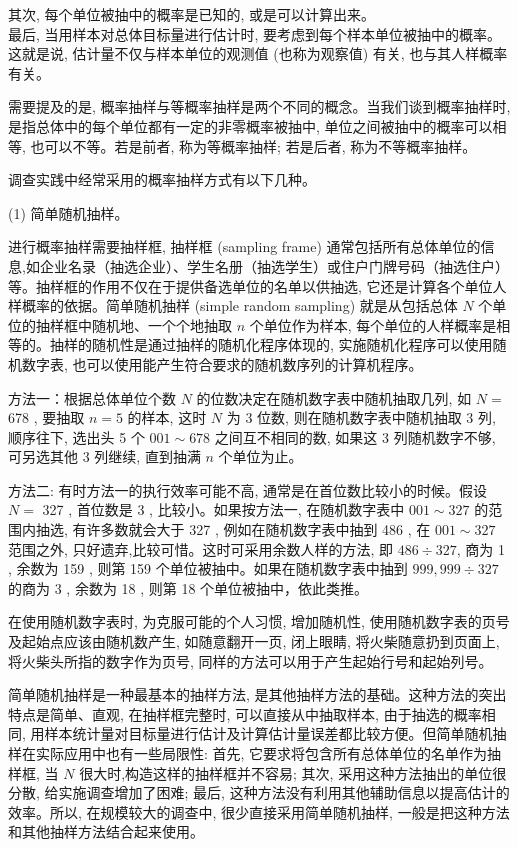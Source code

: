 \documentclass[10pt]{article}
\begin{document}
\begin{CJK*}{UTF8}{bsmi}
其次, 每个单位被抽中的概率是已知的, 或是可以计算出来。\\
最后, 当用样本对总体目标量进行估计时, 要考虑到每个样本单位被抽中的概率。这就是说, 估计量不仅与样本单位的观测值 (也称为观察值) 有关, 也与其人样概率有关。

需要提及的是, 概率抽样与等概率抽样是两个不同的概念。当我们谈到概率抽样时,是指总体中的每个单位都有一定的非零概率被抽中, 单位之间被抽中的概率可以相等, 也可以不等。若是前者, 称为等概率抽样; 若是后者, 称为不等概率抽样。

调查实践中经常采用的概率抽样方式有以下几种。

(1) 简单随机抽样。

进行概率抽样需要抽样框, 抽样框 (sampling frame) 通常包括所有总体单位的信息,如企业名录（抽选企业）、学生名册（抽选学生）或住户门牌号码（抽选住户）等。抽样框的作用不仅在于提供备选单位的名单以供抽选, 它还是计算各个单位人样概率的依据。简单随机抽样 (simple random sampling) 就是从包括总体 $N$ 个单位的抽样框中随机地、一个个地抽取 $n$ 个单位作为样本, 每个单位的人样概率是相等的。抽样的随机性是通过抽样的随机化程序体现的, 实施随机化程序可以使用随机数字表, 也可以使用能产生符合要求的随机数序列的计算机程序。

方法一：根据总体单位个数 $N$ 的位数决定在随机数字表中随机抽取几列, 如 $N=$ 678 , 要抽取 $n=5$ 的样本, 这时 $N$ 为 3 位数, 则在随机数字表中随机抽取 3 列, 顺序往下, 选出头 5 个 $001 \sim 678$ 之间互不相同的数, 如果这 3 列随机数字不够, 可另选其他 3 列继续, 直到抽满 $n$ 个单位为止。

方法二: 有时方法一的执行效率可能不高, 通常是在首位数比较小的时候。假设 $N=$ 327 , 首位数是 3 , 比较小。如果按方法一, 在随机数字表中 $001 \sim 327$ 的范围内抽选, 有许多数就会大于 327 , 例如在随机数字表中抽到 486 , 在 $001 \sim 327$ 范围之外, 只好遗弃,比较可惜。这时可采用余数人样的方法, 即 $486 \div 327$, 商为 1 , 余数为 159 , 则第 159 个单位被抽中。如果在随机数字表中抽到 $999,999 \div 327$ 的商为 3 , 余数为 18 , 则第 18 个单位被抽中，依此类推。

在使用随机数字表时, 为克服可能的个人习惯, 增加随机性, 使用随机数字表的页号及起始点应该由随机数产生, 如随意翻开一页, 闭上眼睛, 将火柴随意扔到页面上, 将火柴头所指的数字作为页号, 同样的方法可以用于产生起始行号和起始列号。

简单随机抽样是一种最基本的抽样方法, 是其他抽样方法的基础。这种方法的突出特点是简单、直观, 在抽样框完整时, 可以直接从中抽取样本, 由于抽选的概率相同, 用样本统计量对目标量进行估计及计算估计量误差都比较方便。但简单随机抽样在实际应用中也有一些局限性: 首先, 它要求将包含所有总体单位的名单作为抽样框, 当 $N$ 很大时,构造这样的抽样框并不容易; 其次, 采用这种方法抽出的单位很分散, 给实施调查增加了困难; 最后, 这种方法没有利用其他辅助信息以提高估计的效率。所以, 在规模较大的调查中, 很少直接采用简单随机抽样, 一般是把这种方法和其他抽样方法结合起来使用。


\end{CJK*}
\end{document}
